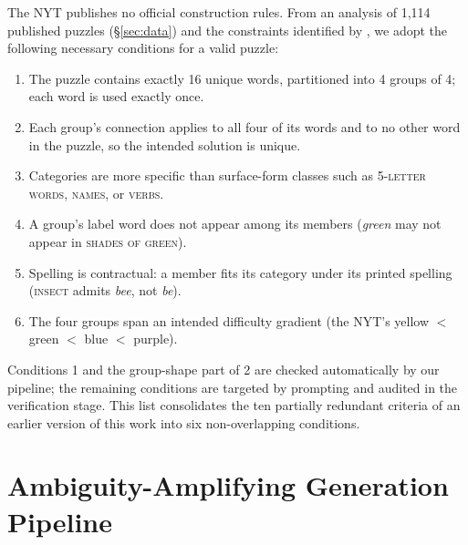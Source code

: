 \documentclass[11pt]{article}
\begin{document}
The NYT publishes no official construction rules. From an analysis of 1,114 published puzzles (\S\ref{sec:data}) and the constraints identified by \citet{merino2024making}, we adopt the following necessary conditions for a valid puzzle:

\begin{enumerate}[leftmargin=*, itemsep=1pt, topsep=2pt]
    \item The puzzle contains exactly 16 unique words, partitioned into 4 groups of 4; each word is used exactly once.
    \item Each group's connection applies to all four of its words and to no other word in the puzzle, so the intended solution is unique.
    \item Categories are more specific than surface-form classes such as \textsc{5-letter words}, \textsc{names}, or \textsc{verbs}.
    \item A group's label word does not appear among its members (\emph{green} may not appear in \textsc{shades of green}).
    \item Spelling is contractual: a member fits its category under its printed spelling (\textsc{insect} admits \emph{bee}, not \emph{be}).
    \item The four groups span an intended difficulty gradient (the NYT's yellow $<$ green $<$ blue $<$ purple).
\end{enumerate}

Conditions 1 and the group-shape part of 2 are checked automatically by our pipeline; the remaining conditions are targeted by prompting and audited in the verification stage. This list consolidates the ten partially redundant criteria of an earlier version of this work into six non-overlapping conditions.

\section{Ambiguity-Amplifying Generation Pipeline}
\label{sec:pipeline}
\end{document}
